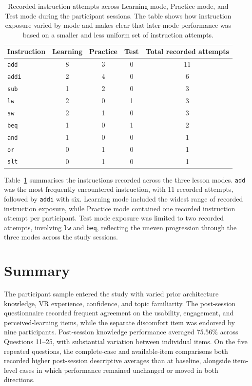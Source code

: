 \begin{table}[!htbp]
\centering
\small
\renewcommand{\arraystretch}{1.12}
\begin{tabularx}{\textwidth}{
    >{\raggedright\arraybackslash}X
    c c c c}
\toprule
\textbf{Instruction} &
\textbf{Learning} &
\textbf{Practice} &
\textbf{Test} &
\textbf{Total recorded attempts} \\
\midrule
\texttt{add}  & 8 & 3 & 0 & 11 \\
\texttt{addi} & 2 & 4 & 0 & 6 \\
\texttt{sub}  & 1 & 2 & 0 & 3 \\
\texttt{lw}   & 2 & 0 & 1 & 3 \\
\texttt{sw}   & 2 & 1 & 0 & 3 \\
\texttt{beq}  & 1 & 0 & 1 & 2 \\
\texttt{and}  & 1 & 0 & 0 & 1 \\
\texttt{or}   & 0 & 1 & 0 & 1 \\
\texttt{slt}  & 0 & 1 & 0 & 1 \\
\bottomrule
\end{tabularx}
\caption[Recorded instruction use across lesson modes]{Recorded instruction attempts across Learning mode, Practice mode, and Test mode during the participant sessions. The table shows how instruction exposure varied by mode and makes clear that later-mode performance was based on a smaller and less uniform set of instruction attempts.}
\label{tab:instruction-usage}
\end{table}

Table~\ref{tab:instruction-usage} summarises the instructions recorded across the three lesson modes. \texttt{add} was the most frequently encountered instruction, with 11 recorded attempts, followed by \texttt{addi} with six. Learning mode included the widest range of recorded instruction exposure, while Practice mode contained one recorded instruction attempt per participant. Test mode exposure was limited to two recorded attempts, involving \texttt{lw} and \texttt{beq}, reflecting the uneven progression through the three modes across the study sessions.


\section{Summary}

The participant sample entered the study with varied prior architecture knowledge, VR experience, confidence, and topic familiarity. The post-session questionnaire recorded frequent agreement on the usability, engagement, and perceived-learning items, while the separate discomfort item was endorsed by nine participants. Post-session knowledge performance averaged 75.56\% across Questions 11--25, with substantial variation between individual items. On the five repeated questions, the complete-case and available-item comparisons both recorded higher post-session descriptive averages than at baseline, alongside item-level cases in which performance remained unchanged or moved in both directions.

